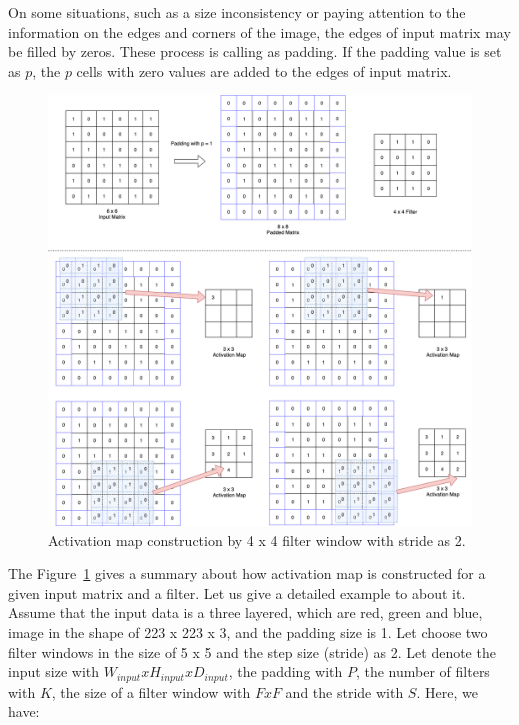 On some situations, such as a size inconsistency or paying attention to the information on the edges and corners of the image, the edges of input matrix may be filled by zeros. These process is calling as padding. If the padding value is set as $p$, the $p$ cells with zero values are added to the edges of input matrix.

\begin{figure}[h]
	\centering
	\includegraphics[width=\linewidth]{fig/conv_layer.png}
	\vspace*{2mm}
	\caption{Activation map construction by 4 x 4 filter window with stride as 2.}
	\label{conv_layer}
\end{figure}

The Figure~\ref{conv_layer} gives a summary about how activation map is constructed for a given input matrix and a filter. Let us give a detailed example to about it. Assume that the input data is a three layered, which are red, green and blue, image in the shape of 223 x 223 x 3, and the padding size is 1. Let choose two filter windows in the size of 5 x 5 and the step size (stride) as 2. Let denote the input size with $W_{input} x H_{input} x D_{input}$, the padding with $P$, the number of filters with $K$, the size of a filter window with $F x F$ and the stride with $S$. Here, we have:

